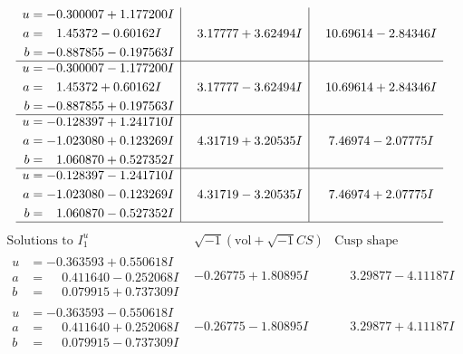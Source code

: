\documentclass[1p]{elsarticle_modified}
\theoremstyle{definition}
\newcommand{\I}{\sqrt{-1}}
\begin{document}
$$\begin{array}{c|c|c}
\begin{aligned}
u &= -0.300007 + 1.177200 I \\
a &= \phantom{-}1.45372 - 0.60162 I \\
b &= -0.887855 - 0.197563 I\end{aligned}
 & \phantom{-}3.17777 + 3.62494 I & \phantom{-}10.69614 - 2.84346 I \\ \hline\begin{aligned}
u &= -0.300007 - 1.177200 I \\
a &= \phantom{-}1.45372 + 0.60162 I \\
b &= -0.887855 + 0.197563 I\end{aligned}
 & \phantom{-}3.17777 - 3.62494 I & \phantom{-}10.69614 + 2.84346 I \\ \hline\begin{aligned}
u &= -0.128397 + 1.241710 I \\
a &= -1.023080 + 0.123269 I \\
b &= \phantom{-}1.060870 + 0.527352 I\end{aligned}
 & \phantom{-}4.31719 + 3.20535 I & \phantom{-}7.46974 - 2.07775 I \\ \hline\begin{aligned}
u &= -0.128397 - 1.241710 I \\
a &= -1.023080 - 0.123269 I \\
b &= \phantom{-}1.060870 - 0.527352 I\end{aligned}
 & \phantom{-}4.31719 - 3.20535 I & \phantom{-}7.46974 + 2.07775 I\\
 \hline 
 \end{array}$$\newpage$$\begin{array}{c|c|c}  
\text{Solutions to }I^u_{1}& \I (\text{vol} + \sqrt{-1}CS) & \text{Cusp shape}\\
 \hline 
\begin{aligned}
u &= -0.363593 + 0.550618 I \\
a &= \phantom{-}0.411640 - 0.252068 I \\
b &= \phantom{-}0.079915 + 0.737309 I\end{aligned}
 & -0.26775 + 1.80895 I & \phantom{-}3.29877 - 4.11187 I \\ \hline\begin{aligned}
u &= -0.363593 - 0.550618 I \\
a &= \phantom{-}0.411640 + 0.252068 I \\
b &= \phantom{-}0.079915 - 0.737309 I\end{aligned}
 & -0.26775 - 1.80895 I & \phantom{-}3.29877 + 4.11187 I \\ \hline\begin{aligned}

\end{aligned}
\end{array}$$
\end{document}
